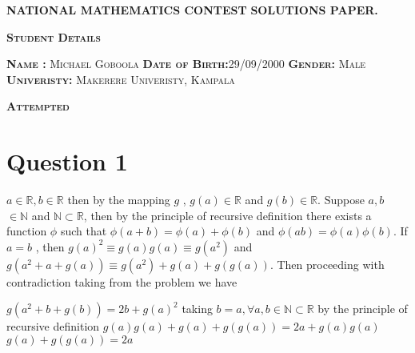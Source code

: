 \documentclass[a4paper, 12pt]{article}
\begin{document}
\begin{justify}
    \fontsize{20pt}{10pt}\selectfont
    \textsc{\textbf{NATIONAL MATHEMATICS CONTEST \newline}}
    \bigskip
    \textsc{\textbf{SOLUTIONS PAPER. \newline}}
    \bigskip
    \bigskip
    
\end{justify}

\begin{center}
    \fontsize{18pt}{10pt}\selectfont
    \textsc{\textbf{Student Details}}
\end{center}

\begin{justify}
    \bigskip
    \bigskip
    \bigskip
    \bigskip
    \bigskip
    \bigskip
    \bigskip
    \bigskip
    \fontsize{16pt}{10pt}\selectfont
    \bigskip
    \textsc{\textbf{Name : \:\:\:\:\:\:\:\:\: \:\:\:\:} Michael Goboola \newline }
    \textsc{\textbf{Date of Birth:\:\:\:}29/09/2000 \newline}
    \textsc{\textbf{Gender: \: \: \:\:\:\:\:\:} Male \newline}
    \textsc{\textbf{Univeristy: \:\:\:\:\:} Makerere Univeristy, Kampala \newline}
\end{justify}

\newpage

\begin{center}
    \fontsize{24pt}{10pt}\selectfont
    \textsc{\textbf{Attempted}}
\end{center}

\section{Question 1}

$a  \in  \mathbb{R}, b  \in  \mathbb{R}$ then by  the mapping $g$ , $g(a)  \in \mathbb{R}$ and
$g(b) \in \mathbb{R}$. Suppose $a,b$ $\in \mathbb{N}$  and $\mathbb{N} \subset \mathbb{R}$, 
then by the principle of recursive definition there exists a function $\phi$ such that
$\phi(a + b) = \phi(a) + \phi(b)$ and $\phi(ab) = \phi(a)\phi(b)$.
If $a = b$ , then $g(a)^2 \equiv g(a)g(a) \equiv g(a^2)$  and $g(a^2 + a + g(a)) \equiv g(a^2)  + g(a) + g(g(a))$.
Then proceeding with contradiction taking from the problem we have

   \begin{justify} 
    \begin{center}
    $g(a^2 + b + g(b)) = 2b + g(a)^2$ \newline
    taking $b = a, \forall a,b \in \mathbb{N} \subset\mathbb{R}$ \newline 
    by the principle of recursive definition \newline
    $g(a)g(a) + g(a) + g(g(a)) = 2a + g(a)g(a)$ \newline
    $g(a) + g(g(a)) = 2a$ \newline
    \end{center}
   \end{justify}
\end{document}
